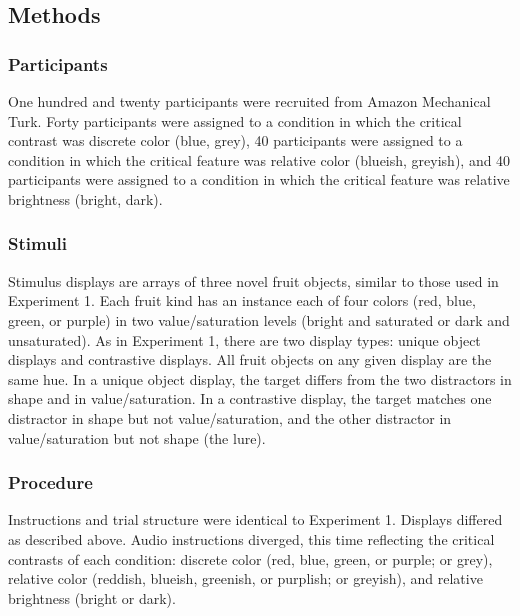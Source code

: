 \documentclass[10pt, letterpaper]{article}
\begin{document}
\subsection{Methods}\label{methods}

\subsubsection{Participants}\label{participants}

One hundred and twenty participants were recruited from Amazon
Mechanical Turk. Forty participants were assigned to a condition in
which the critical contrast was discrete color (blue, grey), 40
participants were assigned to a condition in which the critical feature
was relative color (blueish, greyish), and 40 participants were assigned
to a condition in which the critical feature was relative brightness
(bright, dark).

\subsubsection{Stimuli}\label{stimuli}

Stimulus displays are arrays of three novel fruit objects, similar to
those used in Experiment 1. Each fruit kind has an instance each of four
colors (red, blue, green, or purple) in two value/saturation levels
(bright and saturated or dark and unsaturated). As in Experiment 1,
there are two display types: unique object displays and contrastive
displays. All fruit objects on any given display are the same hue. In a
unique object display, the target differs from the two distractors in
shape and in value/saturation. In a contrastive display, the target
matches one distractor in shape but not value/saturation, and the other
distractor in value/saturation but not shape (the lure).

\subsubsection{Procedure}\label{procedure}

Instructions and trial structure were identical to Experiment 1.
Displays differed as described above. Audio instructions diverged, this
time reflecting the critical contrasts of each condition: discrete color
(red, blue, green, or purple; or grey), relative color (reddish,
blueish, greenish, or purplish; or greyish), and relative brightness
(bright or dark).
\end{document}
